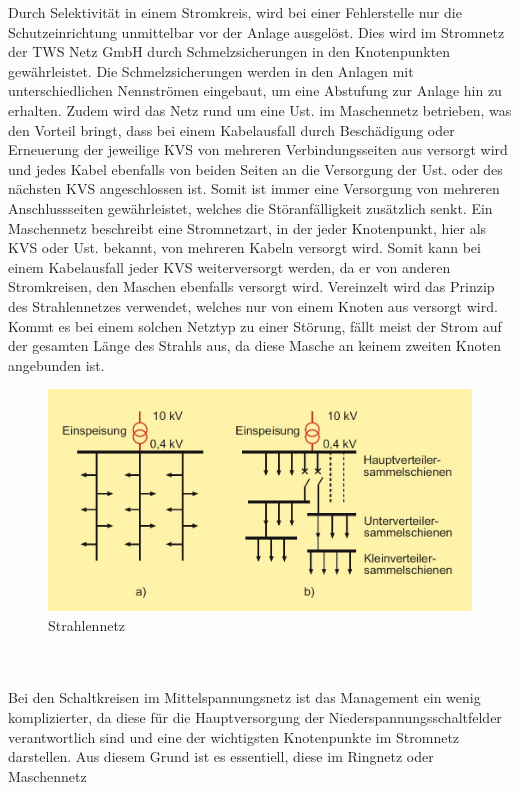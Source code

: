Durch Selektivität in einem Stromkreis, wird bei einer Fehlerstelle nur die Schutzeinrichtung unmittelbar vor der Anlage ausgelöst. Dies wird im Stromnetz 
der TWS Netz GmbH durch Schmelzsicherungen in den Knotenpunkten gewährleistet. Die Schmelzsicherungen werden in den Anlagen mit unterschiedlichen 
Nennströmen eingebaut, um eine Abstufung zur Anlage hin zu erhalten.  Zudem wird das Netz rund um eine Ust. im Maschennetz betrieben, was den Vorteil 
bringt, dass bei einem Kabelausfall durch Beschädigung oder Erneuerung der jeweilige KVS von mehreren Verbindungsseiten aus versorgt wird und jedes Kabel 
ebenfalls von beiden Seiten an die Versorgung der Ust. oder des nächsten KVS angeschlossen ist. Somit ist immer eine Versorgung von mehreren 
Anschlussseiten gewährleistet, welches die Störanfälligkeit zusätzlich senkt. Ein Maschennetz beschreibt eine Stromnetzart, in der jeder Knotenpunkt, 
hier als KVS oder Ust. bekannt, von mehreren Kabeln versorgt wird. Somit kann bei einem Kabelausfall jeder KVS weiterversorgt werden, da er von anderen 
Stromkreisen, den Maschen ebenfalls versorgt wird. Vereinzelt wird das Prinzip des Strahlennetzes  verwendet, welches nur von einem Knoten aus versorgt 
wird. Kommt es bei einem solchen Netztyp zu einer Störung, fällt meist der Strom auf der gesamten Länge des Strahls aus, da diese Masche an keinem zweiten 
Knoten angebunden ist. \autocite{Schwab.2012}
\begin{figure}[hbt]
    \centering
    \includegraphics[width=0.98\linewidth]{images/Strahlennetz}
    \caption[Strahlennetz]{Strahlennetz \autocite{Schwab.2012}}
    \label{fig:Strahlennetz}
\end{figure}
\\\\
Bei den Schaltkreisen im Mittelspannungsnetz ist das Management ein wenig komplizierter, da diese für die Hauptversorgung der Niederspannungsschaltfelder 
verantwortlich sind und eine der wichtigsten Knotenpunkte im Stromnetz darstellen. Aus diesem Grund ist es essentiell, diese im Ringnetz oder Maschennetz 
